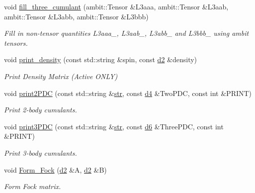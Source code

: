 \begin{DoxyCompactItemize}
void \mbox{\hyperlink{classforte_1_1_m_c_s_r_g_p_t2___m_o_ada5a88df27b0c810a6da3188fe3bfe0b}{fill\+\_\+three\+\_\+cumulant}} (ambit\+::\+Tensor \&L3aaa, ambit\+::\+Tensor \&L3aab, ambit\+::\+Tensor \&L3abb, ambit\+::\+Tensor \&L3bbb)
\begin{DoxyCompactList}\small\item\em Fill in non-\/tensor quantities L3aaa\+\_\+, L3aab\+\_\+, L3abb\+\_\+ and L3bbb\+\_\+ using ambit tensors. \end{DoxyCompactList}\item 
void \mbox{\hyperlink{classforte_1_1_m_c_s_r_g_p_t2___m_o_a2d4dc40b11c8cfb77171700a504602bc}{print\+\_\+density}} (const std\+::string \&spin, const \mbox{\hyperlink{mcsrgpt2__mo_8h_ae5de8a172a3b363a852d6d32e6d90537}{d2}} \&density)
\begin{DoxyCompactList}\small\item\em Print Density Matrix (Active O\+N\+LY) \end{DoxyCompactList}\item 
void \mbox{\hyperlink{classforte_1_1_m_c_s_r_g_p_t2___m_o_a1e0f52e95c5ddeff56ca15b994c2ed27}{print2\+P\+DC}} (const std\+::string \&\mbox{\hyperlink{namespaceforte_af0f9481a38ad3ccb1dd258bdfea20492}{str}}, const \mbox{\hyperlink{mcsrgpt2__mo_8h_a0a2245afece5cd37d3b0b6a462927f69}{d4}} \&Two\+P\+DC, const int \&P\+R\+I\+NT)
\begin{DoxyCompactList}\small\item\em Print 2-\/body cumulants. \end{DoxyCompactList}\item 
void \mbox{\hyperlink{classforte_1_1_m_c_s_r_g_p_t2___m_o_a77aecb3ccbd7d29c8c0c9b6f4cf1502f}{print3\+P\+DC}} (const std\+::string \&\mbox{\hyperlink{namespaceforte_af0f9481a38ad3ccb1dd258bdfea20492}{str}}, const \mbox{\hyperlink{mcsrgpt2__mo_8h_aba90f18433f93c10946dc45fc444d743}{d6}} \&Three\+P\+DC, const int \&P\+R\+I\+NT)
\begin{DoxyCompactList}\small\item\em Print 3-\/body cumulants. \end{DoxyCompactList}\item 
void \mbox{\hyperlink{classforte_1_1_m_c_s_r_g_p_t2___m_o_a7d6c590a53ea89304507133ebe778bce}{Form\+\_\+\+Fock}} (\mbox{\hyperlink{mcsrgpt2__mo_8h_ae5de8a172a3b363a852d6d32e6d90537}{d2}} \&A, \mbox{\hyperlink{mcsrgpt2__mo_8h_ae5de8a172a3b363a852d6d32e6d90537}{d2}} \&B)
\begin{DoxyCompactList}\small\item\em Form Fock matrix. \end{DoxyCompactList}\item 

\end{DoxyCompactItemize}

